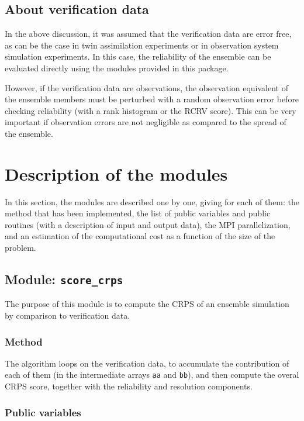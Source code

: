 \documentclass[11pt]{article}
\begin{document}
\subsection{About verification data}

In the above discussion, it was assumed that the verification data are error free,
as can be the case in twin assimilation experiments or
in observation system simulation experiments.
In this case, the reliability of the ensemble
can be evaluated directly using the modules provided in this package.

However, if the verification data are observations,
the observation equivalent of the ensemble members
must be perturbed with a random observation error
before checking reliability (with a rank histogram or the RCRV score).
This can be very important if observation errors are not negligible
as compared to the spread of the ensemble.

\clearpage

\section{Description of the modules}

In this section,
the modules are described one by one,
giving for each of them:
the method that has been implemented,
the list of public variables and public routines
(with a description of input and output data),
the MPI parallelization, and
an estimation of the computational cost
as a function of the size of the problem.

\subsection{Module: {\tt\bf score\_crps}}

The purpose of this module is to compute the CRPS
of an ensemble simulation by comparison to verification data.

\subsubsection*{Method}

The algorithm loops on the verification data,
to accumulate the contribution of each of them
(in the intermediate arrays {\tt aa} and {\tt bb}),
and then compute the overal CRPS score,
together with the reliability and resolution components.

\subsubsection*{Public variables}
\end{document}
